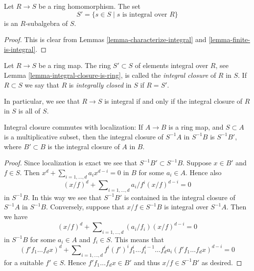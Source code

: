 \begin{lemma}
\label{lemma-integral-closure-is-ring}
Let $R \to S$ be a ring homomorphism.
The set
$$
S' = \{s \in S \mid s\text{ is integral over }R\}
$$
is an $R$-subalgebra of $S$.
\end{lemma}

\begin{proof}
This is clear from Lemmas \ref{lemma-characterize-integral}
and \ref{lemma-finite-is-integral}.
\end{proof}

\begin{definition}
\label{definition-integral-closure}
Let $R \to S$ be a ring map.
The ring $S' \subset S$ of elements integral over
$R$, see Lemma \ref{lemma-integral-closure-is-ring},
is called the {\it integral closure} of $R$
in $S$. If $R \subset S$ we say that $R$ is
{\it integrally closed} in $S$ if $R = S'$.
\end{definition}

\noindent
In particular, we see that $R \to S$ is integral if and only
if the integral closure of $R$ in $S$ is all of $S$.

\begin{lemma}
\label{lemma-integral-closure-localize}
Integral closure commutes with localization: If $A \to B$ is a ring
map, and $S \subset A$ is a multiplicative subset, then the integral
closure of $S^{-1}A$ in $S^{-1}B$ is $S^{-1}B'$, where $B' \subset B$
is the integral closure of $A$ in $B$.
\end{lemma}

\begin{proof}
Since localization is exact we see that $S^{-1}B' \subset S^{-1}B$.
Suppose $x \in B'$ and $f \in S$. Then
$x^d + \sum_{i = 1, \ldots, d} a_i x^{d - i} = 0$
in $B$ for some $a_i \in A$. Hence also
$$
(x/f)^d + \sum\nolimits_{i = 1, \ldots, d} a_i/f^i (x/f)^{d - i} = 0
$$
in $S^{-1}B$. In this way we see that $S^{-1}B'$ is contained in
the integral closure of $S^{-1}A$ in $S^{-1}B$. Conversely, suppose
that $x/f \in S^{-1}B$ is integral over $S^{-1}A$. Then we have
$$
(x/f)^d + \sum\nolimits_{i = 1, \ldots, d} (a_i/f_i) (x/f)^{d - i} = 0
$$
in $S^{-1}B$ for some $a_i \in A$ and $f_i \in S$. This means that
$$
(f'f_1 \ldots f_d x)^d +
\sum\nolimits_{i = 1, \ldots, d}
f^i(f')^if_1^i \ldots f_i^{i - 1} \ldots f_d^i a_i
(f'f_1 \ldots f_dx)^{d - i} = 0
$$
for a suitable $f' \in S$. Hence $f'f_1\ldots f_dx \in B'$ and thus
$x/f \in S^{-1}B'$ as desired.
\end{proof}

